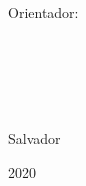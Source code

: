 \begin{folharosto}

\begin{center}
\theauthor \\
\theauthorr \\
\theauthorrr \\
\theauthorrrr \\
\end{center}
\ \\
\ \\
\ \\
\ \\
\ \\
\begin{spacing}{2}
   \begin{center}
   {\LARGE {\bf \thetitle}}
   \end{center}
\end{spacing}
\ \\
\ \\
\ \\
\vspace*{65mm}
 \begin{flushright}

    \begin{list}{}{
       \setlength{\leftmargin}{7.5cm}
       \setlength{\rightmargin}{0cm}
       \setlength{\labelwidth}{0pt}
       \setlength{\labelsep}{\leftmargin}}


       \begin{list}{}{
       \setlength{\leftmargin}{0cm}
       \setlength{\rightmargin}{0cm}
       \setlength{\labelwidth}{0pt}
       \setlength{\labelsep}{\leftmargin}}


       \item Orientador: \theadvisor
       \newline \hspace*{2.1cm}  %

       \end{list}
    \end{list}

 \end{flushright}
\ \\
\ \\
\ \\
\ \\
   \begin{center}
   Salvador \par
   \theuniversity \par
   2020
   \end{center}

\end{folharosto}
